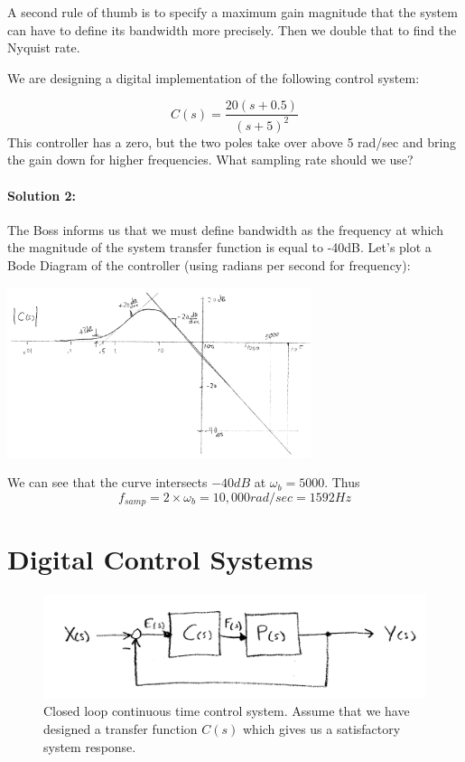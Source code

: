 A second rule of thumb is to specify a maximum gain magnitude that the system can have to define its bandwidth more precisely.  Then we double that to find the
Nyquist rate.

\begin{ExampleSmall}
We are designing a digital implementation of the following control system:

\[
C(s) = \frac  {20(s+0.5)}  {(s+5)^2}
\]
This controller has a zero, but the two poles take over above 5 rad/sec and bring the gain down for higher frequencies.  What sampling rate should we use?

\paragraph{Solution 2:}   The Boss informs us that we must define bandwidth as the frequency at which the magnitude of the system transfer function
is equal to -40dB.  Let's plot a Bode Diagram of the controller (using radians per second for frequency):

\includegraphics[width=3.5in]{figs11/01118.png}

We can see that the curve intersects $-40dB$ at $\omega_b=5000$.   Thus
\[
f_{samp} = 2\times\omega_b =  10,000 rad/sec = 1592 Hz
\]
\end{ExampleSmall}


\section{Digital Control Systems}


\begin{figure}\centering
\includegraphics[width=5.0in]{figs11/ct_cl_sysa.png}
\caption{Closed loop continuous time control system.  Assume that we have designed a transfer function $C(s)$ which gives us a satisfactory system response.}\label{F:ct_cl}
\end{figure}

